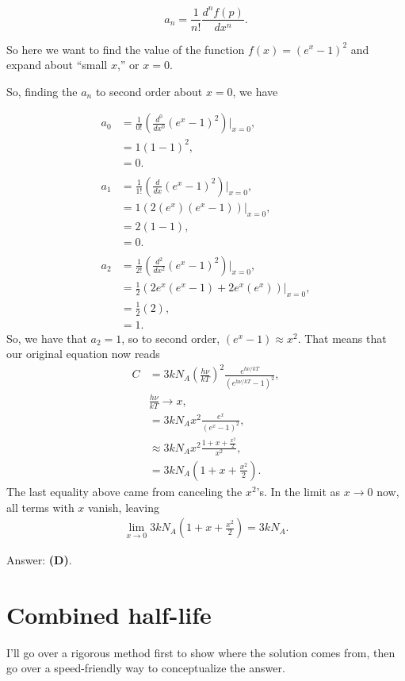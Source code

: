 \documentclass[11pt]{paper}
\newcommand{\answer}[1]{Answer: \textbf{(#1)}.}
\begin{document}
\begin{equation}
a_n = \frac{1}{n!}\frac{d^n f(p)}{dx^n}.
\end{equation}

So here we want to find the value of the function $f(x) = \left(e^x-1\right)^2$ and expand about ``small $x$,'' or $x=0$.

So, finding the $a_n$ to second order about $x=0$, we have

\begin{align}
a_0 &= \frac{1}{0!} \left(\frac{d^0}{dx^0}\left(e^x-1\right)^2\right)\Big|_{x=0},\\
&= 1\left(1-1\right)^2,\\
&=0.\\\\
a_1 &= \frac{1}{1!} \left(\frac{d}{dx}\left(e^x-1\right)^2\right)\Big|_{x=0},\\
&= 1 \left(2(e^x)(e^x-1)\right)\Big|_{x=0},\\
&= 2(1-1),\\
&= 0.\\\\
a_2 &= \frac{1}{2!} \left(\frac{d^2}{dx^2}\left(e^x-1\right)^2\right)\Big|_{x=0},\\
&= \frac{1}{2} \left(2e^x(e^x-1) + 2e^x(e^x)\right)\Big|_{x=0},\\
&= \frac{1}{2} \left(2\right),\\
&= 1.
\end{align}
So, we have that $a_2 = 1$, so to second order, $(e^x-1) \approx x^2$.  That means that our original equation now reads
\begin{align}
C &= 3kN_A\left(\frac{h\nu}{kT}\right)^2\frac{e^{h\nu/kT}}{\left(e^{h\nu/kT}-1\right)^2},\\
&\frac{h\nu}{kT} \rightarrow x,\\
&= 3kN_Ax^2\frac{e^{x}}{\left(e^{x}-1\right)^2},\\
&\approx 3kN_Ax^2\frac{1+x+\frac{x^2}{2}}{x^2},\\
&= 3kN_A\left(1+x+\frac{x^2}{2}\right).
\end{align}
The last equality above came from canceling the $x^2$'s.  In the limit as $x\rightarrow0$ now, all terms with $x$ vanish, leaving
\begin{align}
\lim_{x\rightarrow0} 3kN_A\left(1+x+\frac{x^2}{2}\right) = 3kN_A.
\end{align}

\answer{D}

\section{Combined half-life}
I'll go over a rigorous method first to show where the solution comes from, then go over a speed-friendly way to conceptualize the answer.
\end{document}
